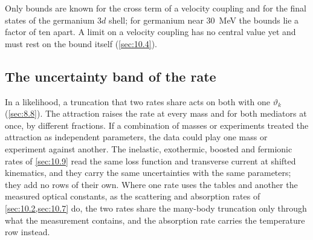 Only bounds are known for the cross term of a velocity coupling and for the final states of the germanium $3d$ shell; for germanium near \SI{30}{MeV} the bounds lie a factor of ten apart. A limit on a velocity coupling has no central value yet and must rest on the bound itself (\cref{sec:10.4}).

\subsection{The uncertainty band of the rate}\label{sec:10.10-table}

In a likelihood, a truncation that two rates share acts on both with one $\vartheta_k$ (\cref{sec:8.8}). The attraction raises the rate at every mass and for both mediators at once, by different fractions. If a combination of masses or experiments treated the attraction as independent parameters, the data could play one mass or experiment against another. The inelastic, exothermic, boosted and fermionic rates of \cref{sec:10.9} read the same loss function and transverse current at shifted kinematics, and they carry the same uncertainties with the same parameters; they add no rows of their own. Where one rate uses the tables and another the measured optical constants, as the scattering and absorption rates of \cref{sec:10.2,sec:10.7} do, the two rates share the many-body truncation only through what the measurement contains, and the absorption rate carries the temperature row instead.

